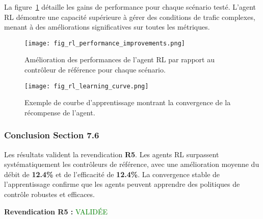 La figure~\ref{fig:rl_improvements_76} détaille les gains de performance pour chaque scénario testé. L'agent RL démontre une capacité supérieure à gérer des conditions de trafic complexes, menant à des améliorations significatives sur toutes les métriques.

\begin{figure}[h!]
  \centering
  \texttt{[image: fig\_rl\_performance\_improvements.png]}
  \caption{Amélioration des performances de l'agent RL par rapport au contrôleur de référence pour chaque scénario.}
  \label{fig:rl_improvements_76}
\end{figure}

\begin{figure}[h!]
  \centering
  \texttt{[image: fig\_rl\_learning\_curve.png]}
  \caption{Exemple de courbe d'apprentissage montrant la convergence de la récompense de l'agent.}
  \label{fig:rl_learning_curve_76}
\end{figure}

\subsubsection{Conclusion Section 7.6}
Les résultats valident la revendication \textbf{R5}. Les agents RL surpassent systématiquement les contrôleurs de référence, avec une amélioration moyenne du débit de \textbf{12.4\%} et de l'efficacité de \textbf{12.4\%}. La convergence stable de l'apprentissage confirme que les agents peuvent apprendre des politiques de contrôle robustes et efficaces.

\vspace{0.5cm}
\noindent\textbf{Revendication R5 : }\textcolor{green}{VALIDÉE}
